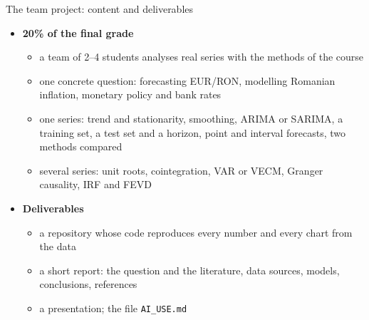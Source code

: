 \begin{frame}{The team project: content and deliverables}
\itemsize{\small}
\begin{itemize}
    \item \textbf{20\% of the final grade}
    \begin{itemize}
        \item a team of 2--4 students analyses real series with the methods of the course
        \item one concrete question: forecasting EUR/RON, modelling Romanian inflation, monetary policy and bank rates
        \item one series: trend and stationarity, smoothing, ARIMA or SARIMA, a training set, a test set and a horizon, point and interval forecasts, two methods compared
        \item several series: unit roots, cointegration, VAR or VECM, Granger causality, IRF and FEVD
    \end{itemize}
    \item \textbf{Deliverables}
    \begin{itemize}
        \item a repository whose code reproduces every number and every chart from the data
        \item a short report: the question and the literature, data sources, models, conclusions, references
        \item a presentation; the file \texttt{AI\_USE.md}
    \end{itemize}
\end{itemize}
\end{frame}

